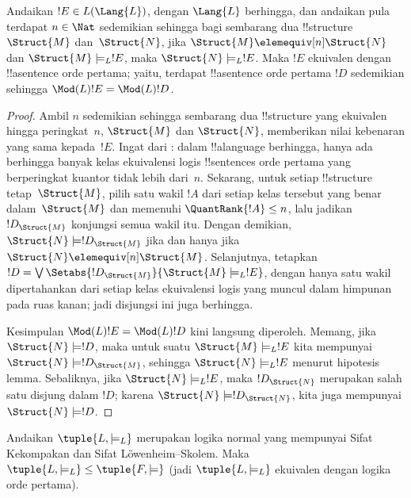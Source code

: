 \documentclass[../../../include/open-logic-section]{subfiles}
\begin{document}


\begin{lem}
Andaikan $!E \in L(\Lang{L})$, dengan $\Lang{L}$ berhingga, dan andaikan pula
terdapat $n \in \Nat$ sedemikian sehingga bagi sembarang dua !!{structure}
$\Struct{M}$ dan~$\Struct{N}$, jika $\Struct{M} \elemequiv[n] \Struct{N}$
dan $\Struct{M} \models_L !E$, maka $\Struct{N} \models_L !E$. Maka $!E$
ekuivalen dengan !!a{sentence} orde pertama; yaitu, terdapat !!a{sentence}
orde pertama $!D$ sedemikian sehingga $\Mod(L){!E} = \Mod(L){!D}$.
\end{lem}

\begin{proof}
Ambil $n$ sedemikian sehingga sembarang dua !!{structure} yang ekuivalen
hingga peringkat~$n$, $\Struct{M}$ dan $\Struct{N}$, memberikan nilai
kebenaran yang sama kepada~$!E$. Ingat dari
: dalam !!a{language} berhingga, hanya ada
berhingga banyak kelas ekuivalensi logis !!{sentence}s orde pertama yang
berperingkat kuantor tidak lebih dari~$n$. Sekarang, untuk setiap
!!{structure} tetap~$\Struct{M}$, pilih satu wakil $!A$ dari setiap kelas
tersebut yang benar dalam~$\Struct{M}$ dan memenuhi $\QuantRank{!A}\le n$,
lalu jadikan $!D_{\Struct{M}}$ konjungsi semua wakil itu. Dengan demikian,
$\Struct{N} \models !D_{\Struct{M}}$ jika dan hanya
jika $\Struct{N} \elemequiv[n] \Struct{M}$. Selanjutnya, tetapkan
$!D = \textstyle\bigvee \Setabs{!D_{\Struct{M}}}{\Struct{M} \models_L !E}$,
dengan hanya satu wakil dipertahankan dari setiap kelas ekuivalensi logis
yang muncul dalam himpunan pada ruas kanan; jadi disjungsi ini juga berhingga.

Kesimpulan $\Mod(L){!E} = \Mod(L){!D}$ kini langsung diperoleh. Memang, jika
$\Struct{N} \models !D$, maka untuk suatu $\Struct{M} \models_L !E$ kita
mempunyai $\Struct{N} \models !D_{\Struct{M}}$, sehingga $\Struct{N}
\models_L !E$ menurut hipotesis lemma. Sebaliknya, jika $\Struct{N}
\models_L !E$, maka $!D_{\Struct{N}}$ merupakan salah satu disjung dalam
$!D$; karena $\Struct{N} \models !D_{\Struct{N}}$, kita juga mempunyai
$\Struct{N} \models !D$.
\end{proof}

\begin{thm}
   Andaikan $\tuple{L, \models_L}$ merupakan logika
  normal yang mempunyai Sifat Kekompakan dan Sifat L\"owenheim--Skolem. Maka
  $\tuple{L, \models_L} \leq \tuple{F, \models}$ (jadi
  $\tuple{L, \models_L}$ ekuivalen dengan logika orde pertama).
\end{thm}
\end{document}
